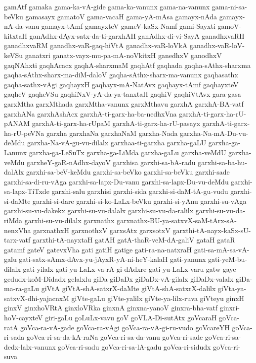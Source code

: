 {gamAtf
gamaka
gama-ka-vA-gide
gama-ka-vanunx
gama-na-vanunx
gama-ni-sa-beVku
gamasayx
gamatoV
gama-vacaH
gama-yA-mAsa
gamayx-nAda
gamayx-nA-da-vanu
gamayx-tAmf
gamayxteV
gameV-kaSx-Namf
gami-Sayxti
gamoV-kitxtaH
ganAdhx-dAyx-satx-da-ti-garxhAH
ganAdhx-di-vi-SayA
ganadhxvaRH
ganadhxvaRM
ganadhx-vaR-gaq-hiVtA
ganadhx-vaR-loVkA
ganadhx-vaR-loV-keVSu
ganatxri
ganatx-vayx-mu-pa-mA-noVkitxH
ganedhxV
ganodhxV
gaqNAhxti
gaqhAcacx
gaqhA-sharxmaM
gaqhAtf
gaqhada
gaqha-sAthx-sharxma
gaqha-sAthx-sharx-ma-diM-daloV
gaqha-sAthx-sharx-ma-vanunx
gaqhasathx
gaqha-sathx-vAgi
gaqhayxH
gaqhayx-mA-NatAvx
gaqhayx-tAmf
gaqhayxteV
gaqheV
gaqheVSu
gaqhiNxV-yA-da-ya-tanxtaH
gaqhiV
gaqhiVtAvx
gara-gasa
garxMtha
garxMthada
garxMtha-vanunx
garxMthavu
garxhA
garxhA-BA-vatf
garxhANa
garxhAshAcx
garxhA-ti-garx-ha-ba-nedhxVna
garxhA-ti-garx-ha-rU-pANAM
garxhA-ti-garx-ha-rUpaM
garxhA-ti-garx-ha-rU-pasayx
garxhA-ti-garx-ha-rU-peVNa
garxha
garxhaNa
garxhaNaM
garxha-Nada
garxha-Na-mA-Du-vu-deMdu
garxha-Na-vA-gu-vu-dilalx
garxhaa-ti-garxha
garxha-gaLU
garxha-ga-Lanunx
garxha-ga-LeSuTx
garxha-ga-LiMda
garxha-gaLu
garxha-veMdU
garxha-veMdu
garxheY-gaR-nAdhx-dayoV
garxhisa
garxhi-sa-bA-radu
garxhi-sa-ba-hu-dalAlx
garxhi-sa-beV-keMdu
garxhi-sa-beVko
garxhi-sa-beVku
garxhi-sade
garxhi-sa-di-ru-vAga
garxhi-sa-lapx-Du-vanu
garxhi-sa-lapx-Du-vu-deMdu
garxhi-sa-lapx-TiTxde
garxhi-salu
garxhisi
garxhi-sida
garxhi-si-daM-tA-gu-vudu
garxhi-si-daMte
garxhi-si-dare
garxhi-si-ko-LaLx-beVku
garxhi-si-yAnu
garxhi-su-vAga
garxhi-su-vu-dakekx
garxhi-su-vu-dalalx
garxhi-su-vu-da-ralilx
garxhi-su-vu-da-riMda
garxhi-su-vu-dilalx
garxnathx
garxnathx-BU-ya-satxvX-saM-tArx-sA-nenxVha
garxnathxH
garxnothxV
garxsAtx
garxsotxV
garxthi-tA-nayx-kaSx-sU-tarx-vatf
garxthi-tA-nayxtaH
gatAH
gatA-thaR-veM-dA-galiV
gataH
gataR
gatamf
gateV
gatevxVha
gati
gatiH
gatige
gati-ra-na-natxraH
gati-sa-mA-sa-vA-galu
gati-satx-sAmx-dAvx-yu-jAyxR-yA-ni-heY-kalaH
gati-yanunx
gati-yeM-bu-dilalx
gati-yilalx
gati-yu-LaLx-va-rA-gi-dAdxre
gati-yu-LaLx-varu
gatw
gaye
gedudx-koM-Didadx
gelalxlu
giDa
giDaDx
giDaDx-vA-gilalx
giDaDx-valalx
giDa-ma-ra-gaLu
giVtA
giVtA-shA-satxrX-daMte
giVtA-shA-satxrX-dalilx
giVta-ya-satxvX-dhi-yajacnxM
giVte-gaLu
giVte-yalilx
giVte-ya-lilx-ruva
giVteyu
ginxH
ginxV
ginxhoVRtA
ginxloVRka
ginxnA
ginxna-yanoV
ginxra-bha-vatf
ginxri-hoV-cayxteV
giri-gaLu
goLuLx-vavu
goV
goVLA-Di-sutAtx
goVcaraH
goVca-ratA
goVca-ra-vA-gade
goVca-ra-vAgi
goVca-ra-vA-gi-ru-vudo
goVcareYH
goVca-ri-sada
goVca-ri-sa-da-kA-raNa
goVca-ri-sa-da-vanu
goVca-ri-sade
goVca-ri-sa-dedx-lalx-vanunx
goVca-ri-sadu
goVca-ri-sa-lA-gadu
goVca-ri-sidudx
goVca-ri-suva
}
